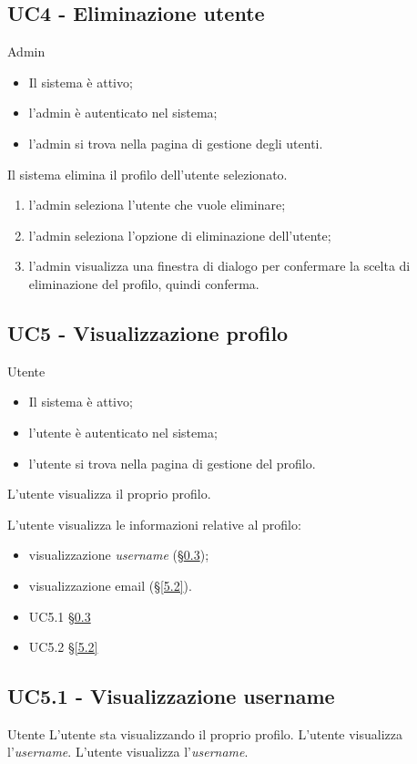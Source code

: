 \subsection{UC4 - Eliminazione utente}
\label{4}
\makeUC{}
{Admin}
{   \begin{itemize}
        \item Il sistema è attivo;
        \item l'admin è autenticato nel sistema;
        \item l'admin si trova nella pagina di gestione degli utenti.
    \end{itemize}
}
{Il sistema elimina il profilo dell'utente selezionato.}
{   \begin{enumerate}
        \item l'admin seleziona l'utente che vuole eliminare;
        \item l'admin seleziona l'opzione di eliminazione dell'utente;
        \item l'admin visualizza una finestra di dialogo per confermare la scelta di 
        eliminazione del profilo, quindi conferma.
    \end{enumerate}
}
{}{}{}{}

\subsection{UC5 - Visualizzazione profilo}
\label{5}
{Utente}
{   \begin{itemize}
        \item Il sistema è attivo;
        \item l'utente è autenticato nel sistema;
        \item l'utente si trova nella pagina di gestione del profilo.
    \end{itemize}
}
{L'utente visualizza il proprio profilo.}
{L'utente visualizza le informazioni relative al profilo:
    \begin{itemize}
        \item visualizzazione \textit{username} (§\ref{5.1});
        \item visualizzazione email (§\ref{5.2}).
    \end{itemize}
}
{   \begin{itemize}
        \item UC5.1 §\ref{5.1}
        \item UC5.2 §\ref{5.2}
    \end{itemize} 
}{}{}{}

\subsection{UC5.1 - Visualizzazione username}
\label{5.1}
\makeUC{}
{Utente}
{L'utente sta visualizzando il proprio profilo.}
{L'utente visualizza l'\textit{username}.}
{L'utente visualizza l'\textit{username}.}{}{}{}{}


